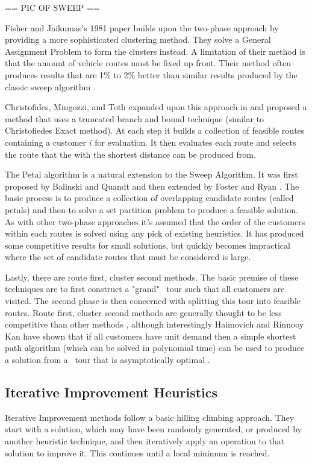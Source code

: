 == PIC OF SWEEP == 

Fisher and Jaikumas's 1981 paper builds upon the two-phase approach by providing a more sophisticated clustering method. They solve a General Assignment Problem to form the clusters instead. A limitation of their method is that the amount of vehicle routes must be fixed up front. Their method often produces results that are 1\% to 2\% better than similar results produced by the classic sweep algorithm \cite{TV2001}. 

Christofides, Mingozzi, and Toth expanded upon this approach in \cite{???} and proposed a method that uses a truncated branch and bound technique (similar to Christofiedes Exact method). At each step it builds a collection of feasible routes containing a customer $i$ for evaluation. It then evaluates each route and selects the route that the \TSP with the shortest distance can be produced from.

The Petal algorithm is a natural extension to the Sweep Algorithm. It was first proposed by Balinski and Quandt \cite{??} and then extended by Foster and Ryan \cite{??}. The basic process is to produce a collection of overlapping candidate routes (called petals) and then to solve a set partition problem to produce a feasible solution. As with other two-phase approaches it's assumed that the order of the customers within each routes is solved using any pick of existing \TSP heuristics. It has produced some competitive results for small solutions, but quickly becomes impractical where the set of candidate routes that must be considered is large.  

Lastly, there are route first, cluster second methods. The basic premise of these techniques are to first construct a "grand" \TSP\ tour such that all customers are visited. The second phase is then concerned with splitting this tour into feasible routes. Route first, cluster second methods are generally thought to be less competitive than other methods \cite{Laporte:1999}, although interestingly Haimovich and Rinnooy Kan have shown that if all customers have unit demand then a simple shortest path algorithm (which can be solved in polynomial time) can be used to produce a solution from a \TSP\ tour that is asymptotically optimal \cite{HK:1985}.

\subsection{Iterative Improvement Heuristics}

Iterative Improvement methods follow a basic hilling climbing approach. They start with a solution, which may have been randomly generated, or produced by another heuristic technique, and then iteratively apply an operation to that solution to improve it. This continues until a local minimum is reached.

